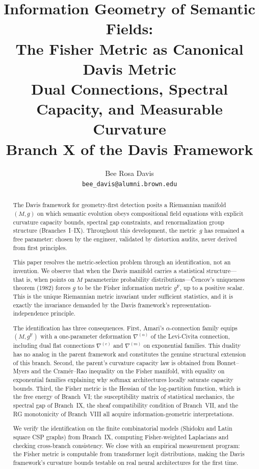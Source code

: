 \documentclass[11pt]{article}
\title{\textbf{Information Geometry of Semantic Fields:}\\[0.25ex]
\textbf{The Fisher Metric as Canonical Davis Metric}\\[0.5ex]
\large Dual Connections, Spectral Capacity, and Measurable Curvature\\[0.25ex]
\large Branch X of the Davis Framework}
\author{Bee Rosa Davis\\
\small \texttt{bee\_davis@alumni.brown.edu}}
\date{}
\newcommand{\gF}{g^{\mathrm{F}}}
\theoremstyle{remark}
\begin{document}
\maketitle
\vspace{-1.5ex}

\begin{abstract}
The Davis framework for geometry-first detection posits a Riemannian manifold
$(M, g)$ on which semantic evolution obeys compositional field equations with
explicit curvature capacity bounds, spectral gap constraints, and
renormalization group structure (Branches~I--IX).  Throughout this development,
the metric~$g$ has remained a free parameter: chosen by the engineer, validated
by distortion audits, never derived from first principles.

This paper resolves the metric-selection problem through an identification, not
an invention.  We observe that when the Davis manifold carries a statistical
structure---that is, when points on $M$ parameterize probability
distributions---\v{C}encov's uniqueness theorem (1982) forces $g$ to be the
Fisher information metric $\gF$, up to a positive scalar.  This is the unique
Riemannian metric invariant under sufficient statistics, and it is exactly the
invariance demanded by the Davis framework's representation-independence
principle.

The identification has three consequences.  First, Amari's
$\alpha$-connection family equips $(M, \gF)$ with a one-parameter deformation
$\nabla^{(\alpha)}$ of the Levi-Civita connection, including dual flat
connections $\nabla^{(e)}$ and $\nabla^{(m)}$ on exponential families.  This
duality has no analog in the parent framework and constitutes the genuine
structural extension of this branch.  Second, the parent's curvature capacity
law is obtained from Bonnet--Myers and the Cram\'er--Rao inequality on the Fisher
manifold, with equality on exponential families explaining why softmax
architectures locally saturate capacity bounds.  Third, the Fisher metric is the
Hessian of the log-partition function, which is the free energy of Branch~VI;
the susceptibility matrix of statistical mechanics, the spectral gap of
Branch~IX, the sheaf compatibility condition of Branch~VII, and the RG
monotonicity of Branch~VIII all acquire information-geometric interpretations.

We verify the identification on the finite combinatorial models (Shidoku and
Latin square CSP graphs) from Branch~IX, computing Fisher-weighted Laplacians
and checking cross-branch consistency.  We close with an empirical measurement
program: the Fisher metric is computable from transformer logit distributions,
making the Davis framework's curvature bounds testable on real neural
architectures for the first time.
\end{abstract}
\end{document}
